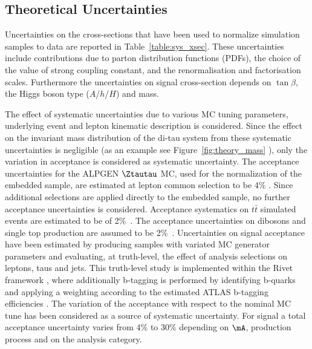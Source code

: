 \subsection{Theoretical Uncertainties}
\label{sec:sys_theory}

Uncertainties on the cross-sections that have been used to normalize
simulation samples to data are reported in
Table~\ref{table:sys_xsec}. These
uncertainties include contributions due to parton distribution
functions (PDFs), the choice of the value of strong coupling constant,
and the renormalisation and factorisation scales.  Furthermore the
uncertainties on signal cross-section depends on $\tan\beta$, the
Higgs boson type ($A$/$h$/$H$) and mass.

The effect of systematic uncertainties due to various MC tuning
parameters, underlying event and
lepton kinematic description is considered.
Since the effect on the invariant mass distribution of the di-tau system from these systematic
uncertainties is negligible (as an example see
Figure~\ref{fig:theory_mass} ), only the variation in
acceptance is considered as systematic uncertainty.
The acceptance uncertainties for the ALPGEN $\Ztautau$  MC, used for the normalization of the embedded sample, 
are estimated at lepton common selection to be 4\% \cite{2010SMLLSupportNote}.
Since additional selections are applied directly to the embedded sample, 
no further acceptance uncertainties is considered. Acceptance systematics on
$t\bar{t}$ simulated events are estimated to be of 2\%~\cite{ttbaremu}. %
The acceptance uncertainties on dibosons and single top production are assumed to be 2\%~\cite{2010SMLLSupportNote}.
Uncertainties on signal acceptance have been estimated
by producing samples with variated MC generator parameters and evaluating, at
truth-level, the effect of analysis selections on leptons, taus and
jets. This truth-level study is implemented within the Rivet framework
\cite{RIVET}, where additionally b-tagging is performed by identifying b-quarks and applying
a weighting according to the estimated ATLAS b-tagging
efficiencies \cite{BtaggingScaleFactors}. The variation of the acceptance
with respect to the nominal MC tune has  been considered as
a source of systematic uncertainty. For signal a total acceptance 
uncertainty varies from 4\% to 30\% depending on $\mA$, production process 
and on the analysis category.

